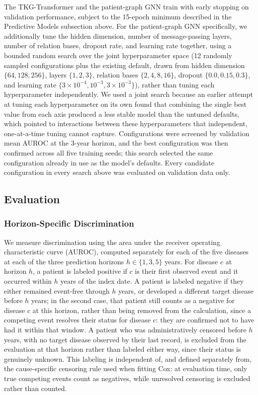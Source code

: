 The TKG-Transformer and the patient-graph GNN train with early stopping on validation performance, subject to the 15-epoch minimum described in the Predictive Models subsection above. For the patient-graph GNN specifically, we additionally tune the hidden dimension, number of message-passing layers, number of relation bases, dropout rate, and learning rate together, using a bounded random search over the joint hyperparameter space (12 randomly sampled configurations plus the existing default, drawn from hidden dimension $\{64,128,256\}$, layers $\{1,2,3\}$, relation bases $\{2,4,8,16\}$, dropout $\{0.0,0.15,0.3\}$, and learning rate $\{3\times10^{-4}, 10^{-3}, 3\times10^{-3}\}$), rather than tuning each hyperparameter independently. We used a joint search because an earlier attempt at tuning each hyperparameter on its own found that combining the single best value from each axis produced a less stable model than the untuned defaults, which pointed to interactions between these hyperparameters that independent, one-at-a-time tuning cannot capture. Configurations were screened by validation mean AUROC at the 3-year horizon, and the best configuration was then confirmed across all five training seeds; this search selected the same configuration already in use as the model's defaults. Every candidate configuration in every search above was evaluated on validation data only.

\subsection{Evaluation}
\label{sec:eval}

\subsubsection{Horizon-Specific Discrimination}
\label{sec:eval-auroc}

We measure discrimination using the area under the receiver operating characteristic curve (AUROC), computed separately for each of the five diseases at each of the three prediction horizons $h \in \{1, 3, 5\}$ years. For disease $c$ at horizon $h$, a patient is labeled positive if $c$ is their first observed event and it occurred within $h$ years of the index date. A patient is labeled negative if they either remained event-free through $h$ years, or developed a different target disease before $h$ years; in the second case, that patient still counts as a negative for disease $c$ at this horizon, rather than being removed from the calculation, since a competing event resolves their status for disease $c$: they are confirmed not to have had it within that window. A patient who was administratively censored before $h$ years, with no target disease observed by their last record, is excluded from the evaluation at that horizon rather than labeled either way, since their status is genuinely unknown. This labeling is independent of, and defined separately from, the cause-specific censoring rule used when fitting Cox: at evaluation time, only true competing events count as negatives, while unresolved censoring is excluded rather than counted.

